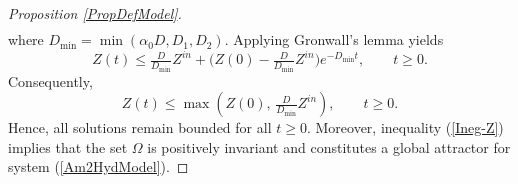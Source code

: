 \documentclass[runningheads]{llncs}
\begin{document}
\begin{proof}[Proposition \ref{PropDefModel}]
\begin{align*}
\end{align*}
where $D_{\min}=\min(\alpha_0 D,D_1,D_2)$. Applying Gronwall's lemma yields
\begin{equation}   \label{Ineg-Z}
Z(t)\le
\tfrac{D}{D_{\min}}Z^{in}
+\Big(Z(0)-\tfrac{D}{D_{\min}}Z^{in}\Big)e^{-D_{\min}t},
\qquad t\ge0 .
\end{equation}
Consequently,
\[
Z(t)\le
\max\!\left(Z(0),\,\tfrac{D}{D_{\min}}Z^{in}\right),
\qquad t\ge0 .
\]
Hence, all solutions remain bounded for all $t\ge0$.  
Moreover, inequality (\ref{Ineg-Z}) implies that the set $\Omega$ is positively invariant and constitutes a global attractor for system (\ref{Am2HydModel}).
\end{proof}
\end{document}
